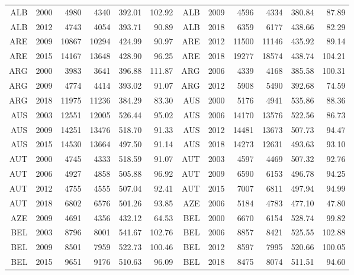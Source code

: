 {\begin{longtable}{r|r|r|r|r|r||r|r|r|r|r|r}
\hline \hline
\endlastfoot
    ALB   & 2000  & 4980  & 4340  & 392.01 & 102.92  & ALB   & 2009  & 4596  & 4334  & 380.84 & 87.89 \\
    ALB   & 2012  & 4743  & 4054  & 393.71 & 90.89 & ALB   & 2018  & 6359  & 6177  & 438.66 & 82.29 \\
    ARE   & 2009  & 10867 & 10294 & 424.99 & 90.97 & ARE   & 2012  & 11500 & 11146 & 435.92 & 89.14 \\
    ARE   & 2015  & 14167 & 13648 & 428.90 & 96.25 & ARE   & 2018  & 19277 & 18574 & 438.74 & 104.21 \\
    ARG   & 2000  & 3983  & 3641  & 396.88 & 111.87 & ARG   & 2006  & 4339  & 4168  & 385.58 & 100.31 \\
    ARG   & 2009  & 4774  & 4414  & 393.02 & 91.07 & ARG   & 2012  & 5908  & 5490  & 392.68 & 74.59 \\
    ARG   & 2018  & 11975 & 11236 & 384.29 & 83.30 & AUS   & 2000  & 5176  & 4941  & 535.86 & 88.36 \\
    AUS   & 2003  & 12551 & 12005 & 526.44 & 95.02 & AUS   & 2006  & 14170 & 13576 & 522.56 & 86.73 \\
    AUS   & 2009  & 14251 & 13476 & 518.70 & 91.33 & AUS   & 2012  & 14481 & 13673 & 507.73 & 94.47 \\
    AUS   & 2015  & 14530 & 13664 & 497.50 & 91.14 & AUS   & 2018  & 14273 & 12631 & 493.63 & 93.10 \\
    AUT   & 2000  & 4745  & 4333  & 518.59 & 91.07 & AUT   & 2003  & 4597  & 4469  & 507.32 & 92.76 \\
    AUT   & 2006  & 4927  & 4858  & 505.88 & 96.92 & AUT   & 2009  & 6590  & 6153  & 496.78 & 94.25 \\
    AUT   & 2012  & 4755  & 4555  & 507.04 & 92.41 & AUT   & 2015  & 7007  & 6811  & 497.94 & 94.99 \\
    AUT   & 2018  & 6802  & 6576  & 501.26 & 93.85 & AZE   & 2006  & 5184  & 4783  & 477.10 & 47.80 \\
    AZE   & 2009  & 4691  & 4356  & 432.12 & 64.53 & BEL   & 2000  & 6670  & 6154  & 528.74 & 99.82 \\
    BEL   & 2003  & 8796  & 8001  & 541.67 & 102.76 & BEL   & 2006  & 8857  & 8421  & 525.55 & 102.88 \\
    BEL   & 2009  & 8501  & 7959  & 522.73 & 100.46 & BEL   & 2012  & 8597  & 7995  & 520.66 & 100.05 \\
    BEL   & 2015  & 9651  & 9176  & 510.63 & 96.09 & BEL   & 2018  & 8475  & 8074  & 511.51 & 94.60 \\

\end{longtable}}
